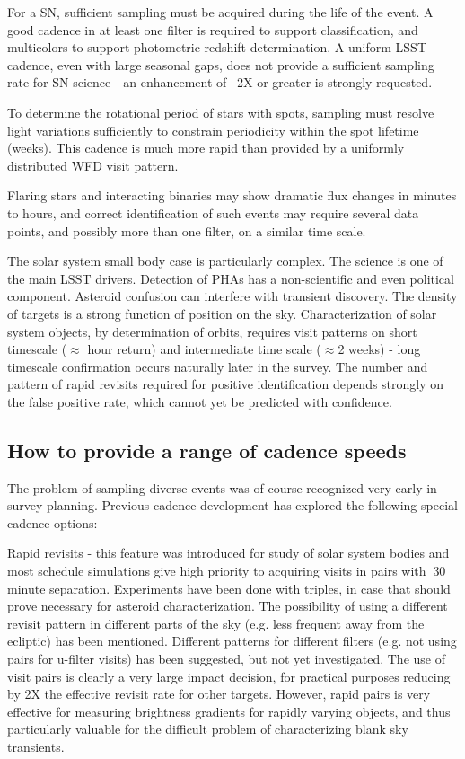 For a SN, sufficient sampling must be acquired during the life of the event. A good cadence in at least one filter is required to support classification, and multicolors to support photometric redshift determination.  A uniform LSST  cadence, even with large seasonal gaps, does not provide a sufficient sampling rate for SN science - an enhancement of ~2X or greater is strongly requested.
	
To determine the rotational period of stars with spots, sampling must resolve light variations sufficiently to constrain periodicity within the spot lifetime (weeks). This cadence is much more rapid than provided by a uniformly distributed WFD visit pattern.
	
Flaring stars and interacting binaries  may show dramatic flux changes in minutes to hours, and correct identification of such events may require several data points, and possibly more than one filter, on a similar time scale.
	
The solar system small body case is particularly complex.  The science is one of the main LSST drivers.  Detection of PHAs has a non-scientific and even political component. Asteroid confusion can interfere with transient discovery. The density of targets is a strong function of position on the sky.  Characterization of solar system objects, by determination of orbits, requires visit patterns on short timescale ($\approx$ hour return) and intermediate time scale ($\approx$2 weeks) - long timescale confirmation occurs naturally later in the survey.  The number and pattern of rapid revisits required for positive identification depends strongly on the false positive rate, which cannot yet be predicted with confidence. 

\subsection{How to provide a range of cadence speeds}

The problem of sampling diverse events was of course recognized very early in survey planning. Previous cadence development has explored the following special cadence options:

	Rapid revisits - this feature was introduced for study of solar system bodies and most schedule simulations give high priority to acquiring visits in pairs with $~$30 minute separation.  Experiments have been done with triples, in case that should prove necessary for asteroid characterization.  The possibility of using a different revisit pattern in different parts of the sky (e.g. less frequent away from the ecliptic) has been mentioned.  Different patterns for different filters (e.g. not using pairs for u-filter visits) has been suggested, but not yet investigated.  The use of visit pairs is clearly a very large impact decision, for practical purposes reducing by 2X the effective revisit rate for other targets. However, rapid pairs is very effective for measuring brightness gradients for rapidly varying objects, and thus particularly valuable for the difficult problem of characterizing blank sky transients.
	
